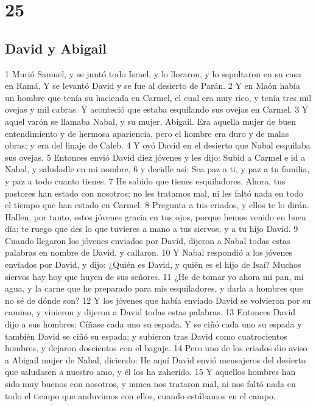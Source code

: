 \chapter{25}

\section*{David y Abigail}

1 Murió Samuel, y se juntó todo Israel, y lo lloraron, y lo sepultaron en su casa en Ramá. Y se levantó David y se fue al desierto de Parán.
2 Y en Maón había un hombre que tenía su hacienda en Carmel, el cual era muy rico, y tenía tres mil ovejas y mil cabras. Y aconteció que estaba esquilando sus ovejas en Carmel.
3 Y aquel varón se llamaba Nabal, y su mujer, Abigail. Era aquella mujer de buen entendimiento y de hermosa apariencia, pero el hombre era duro y de malas obras; y era del linaje de Caleb.
4 Y oyó David en el desierto que Nabal esquilaba sus ovejas.
5 Entonces envió David diez jóvenes y les dijo: Subid a Carmel e id a Nabal, y saludadle en mi nombre,
6 y decidle así: Sea paz a ti, y paz a tu familia, y paz a todo cuanto tienes.
7 He sabido que tienes esquiladores. Ahora, tus pastores han estado con nosotros; no les tratamos mal, ni les faltó nada en todo el tiempo que han estado en Carmel.
8 Pregunta a tus criados, y ellos te lo dirán. Hallen, por tanto, estos jóvenes gracia en tus ojos, porque hemos venido en buen día; te ruego que des lo que tuvieres a mano a tus siervos, y a tu hijo David.
9 Cuando llegaron los jóvenes enviados por David, dijeron a Nabal todas estas palabras en nombre de David, y callaron.
10 Y Nabal respondió a los jóvenes enviados por David, y dijo: ¿Quién es David, y quién es el hijo de Isaí? Muchos siervos hay hoy que huyen de sus señores.
11 ¿He de tomar yo ahora mi pan, mi agua, y la carne que he preparado para mis esquiladores, y darla a hombres que no sé de dónde son?
12 Y los jóvenes que había enviado David se volvieron por su camino, y vinieron y dijeron a David todas estas palabras.
13 Entonces David dijo a sus hombres: Cíñase cada uno su espada. Y se ciñó cada uno su espada y también David se ciñó su espada; y subieron tras David como cuatrocientos hombres, y dejaron doscientos con el bagaje.
14 Pero uno de los criados dio aviso a Abigail mujer de Nabal, diciendo: He aquí David envió mensajeros del desierto que saludasen a nuestro amo, y él los ha zaherido.
15 Y aquellos hombres han sido muy buenos con nosotros, y nunca nos trataron mal, ni nos faltó nada en todo el tiempo que anduvimos con ellos, cuando estábamos en el campo.
